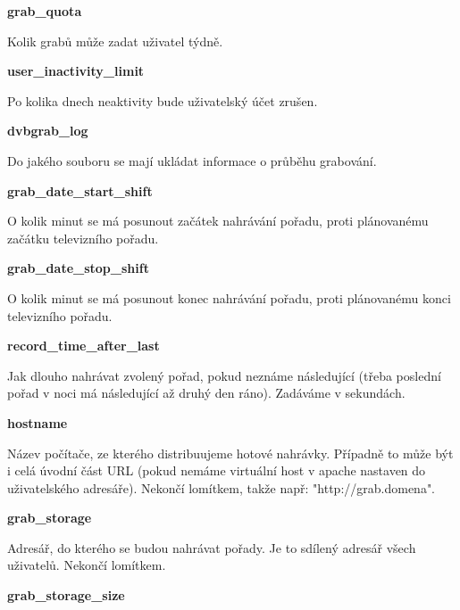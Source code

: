 \vspace{10pt}

\textbf{grab\_quota}

Kolik grabů může zadat uživatel týdně.

\vspace{10pt}

\textbf{user\_inactivity\_limit}

Po kolika dnech neaktivity bude uživatelský účet zrušen.

\vspace{10pt}

\textbf{dvbgrab\_log}

Do jakého souboru se mají ukládat informace o průběhu grabování.

\vspace{10pt}

\textbf{grab\_date\_start\_shift}

O kolik minut se má posunout začátek nahrávání pořadu, proti plánovanému začátku televizního pořadu.

\vspace{10pt}

\textbf{grab\_date\_stop\_shift}

O kolik minut se má posunout konec nahrávání pořadu, proti plánovanému konci televizního pořadu.

\vspace{10pt}

\textbf{record\_time\_after\_last}

Jak dlouho nahrávat zvolený pořad, pokud neznáme následující (třeba poslední pořad v noci má následující až druhý den ráno). Zadáváme v sekundách.

\vspace{10pt}

\textbf{hostname}

Název počítače, ze kterého distribuujeme hotové nahrávky. Případně to může být i celá úvodní část URL (pokud nemáme virtuální host v apache nastaven do uživatelského adresáře). Nekončí lomítkem, takže např: "http://grab.domena".

\vspace{10pt}

\textbf{grab\_storage}

Adresář, do kterého se budou nahrávat pořady. Je to sdílený adresář všech uživatelů. Nekončí lomítkem.

\vspace{10pt}

\textbf{grab\_storage\_size}

